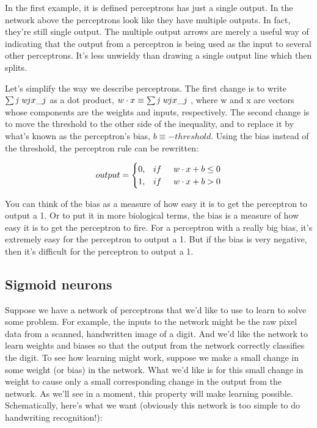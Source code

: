 \documentclass[]{article}
\begin{document}
In the first example, it is defined perceptrons has just a single
output. In the network above the perceptrons look like they have
multiple outputs. In fact, they're still single output. The multiple
output arrows are merely a useful way of indicating that the output from
a perceptron is being used as the input to several other perceptrons.
It's less unwieldy than drawing a single output line which then splits.

Let's simplify the way we describe perceptrons. The first change is to
write $ \sum\emph{j w}jx\_j $ as a dot product,
$ w \cdot x \equiv \sum\emph{j w}jx\_j $ ,
where w and x are vectors whose components are the weights and inputs, respectively.
The second change is to move the threshold to the other side of the inequality, and to replace
it by what's known as the perceptron's bias, $ b \equiv −threshold. $ Using the bias instead of the threshold, the
perceptron rule can be rewritten:

\begin{equation}
    output =
    \begin{cases}
        0,& if  \hspace{0.5 cm} w \cdot x + b \leq 0 \\
        1,& if  \hspace{0.5 cm}  w \cdot x + b > 0
    \end{cases}
\end{equation}

You can think of the bias as a measure of how easy it is to get the
perceptron to output a 1. Or to put it in more biological terms, the
bias is a measure of how easy it is to get the perceptron to fire. For a
perceptron with a really big bias, it's extremely easy for the
perceptron to output a 1. But if the bias is very negative, then it's
difficult for the perceptron to output a 1.

\subsection{Sigmoid neurons}\label{sigmoid-neurons}

Suppose we have a network of perceptrons that we'd like to use to learn
to solve some problem. For example, the inputs to the network might be
the raw pixel data from a scanned, handwritten image of a digit. And
we'd like the network to learn weights and biases so that the output
from the network correctly classifies the digit. To see how learning
might work, suppose we make a small change in some weight (or bias) in
the network. What we'd like is for this small change in weight to cause
only a small corresponding change in the output from the network. As
we'll see in a moment, this property will make learning possible.
Schematically, here's what we want (obviously this network is too simple
to do handwriting recognition!):
\end{document}
